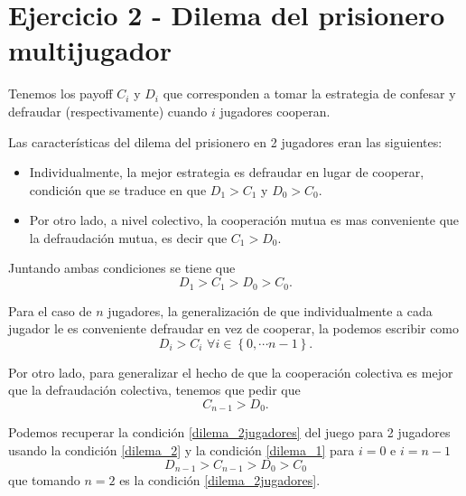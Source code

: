 \clearpage
\section*{Ejercicio 2 - Dilema del prisionero multijugador}

Tenemos los payoff $C_i$ y $D_i$ que corresponden a tomar la estrategia de confesar y defraudar (respectivamente) cuando $i$ jugadores cooperan. 

Las características del dilema del prisionero en 2 jugadores eran las siguientes:
\begin{itemize}
    \item Individualmente, la mejor estrategia es defraudar en lugar de cooperar, condición que se traduce en que $D_1 > C_1$ y $D_0 > C_0$.
    \item Por otro lado, a nivel colectivo, la cooperación mutua es mas conveniente que la defraudación mutua, es decir que $C_1 > D_0$.
\end{itemize}

Juntando ambas condiciones se tiene que
\begin{equation}
    D_1 > C_1 > D_0 > C_0.
    \label{dilema_2jugadores}
\end{equation}

Para el caso de $n$ jugadores, la generalización de que individualmente a cada jugador le es conveniente defraudar en vez de cooperar, la podemos escribir como
\begin{equation}
    D_i > C_i\,\, \forall i \in \left\lbrace 0, \cdots n-1 \right\rbrace.
    \label{dilema_1}
\end{equation}

Por otro lado, para generalizar el hecho de que la cooperación colectiva es mejor que la defraudación colectiva, tenemos que pedir que
\begin{equation}
    C_{n-1} > D_0.
    \label{dilema_2}
\end{equation}

Podemos recuperar la condición \ref{dilema_2jugadores} del juego para 2 jugadores usando la condición \ref{dilema_2} y la condición \ref{dilema_1} para $i=0$ e $i=n-1$
\begin{equation}
    D_{n-1} > C_{n-1} > D_0 > C_0
\end{equation}
que tomando $n=2$ es la condición \ref{dilema_2jugadores}.
